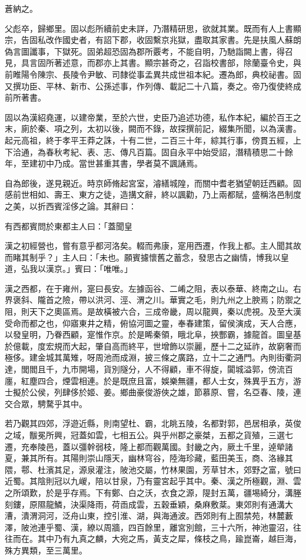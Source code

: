 \begin{pinyinscope}
蒼納之。

父彪卒，歸鄉里。固以彪所續前史未詳，乃潛精研思，欲就其業。既而有人上書顯宗，告固私改作國史者，有詔下郡，收固繫京兆獄，盡取其家書。先是扶風人蘇朗偽言圖讖事，下獄死。固弟超恐固為郡所覈考，不能自明，乃馳詣闕上書，得召見，具言固所著述意，而郡亦上其書。顯宗甚奇之，召詣校書部，除蘭臺令史，與前睢陽令陳宗、長陵令尹敏、司隸從事孟異共成世祖本紀。遷為郎，典校祕書。固又撰功臣、平林、新市、公孫述事，作列傳、載記二十八篇，奏之。帝乃復使終成前所著書。

固以為漢紹堯運，以建帝業，至於六世，史臣乃追述功德，私作本紀，編於百王之末，廁於秦、項之列，太初以後，闕而不錄，故探撰前記，綴集所聞，以為漢書。起元高祖，終于孝平王莽之誅，十有二世，二百三十年，綜其行事，傍貫五經，上下洽通，為春秋考紀、表、志、傳凡百篇。固自永平中始受詔，潛精積思二十餘年，至建初中乃成。當世甚重其書，學者莫不諷誦焉。

自為郎後，遂見親近。時京師脩起宮室，濬繕城隍，而關中耆老猶望朝廷西顧。固感前世相如、壽王、東方之徒，造搆文辭，終以諷勸，乃上兩都賦，盛稱洛邑制度之美，以折西賓淫侈之論。其辭曰：

有西都賓問於東都主人曰：「蓋聞皇

漢之初經營也，嘗有意乎都河洛矣。輟而弗康，寔用西遷，作我上都。主人聞其故而睹其制乎？」主人曰：「未也。願賓攄懷舊之蓄念，發思古之幽情，博我以皇道，弘我以漢京。」賓曰：「唯唯。」

漢之西都，在于雍州，寔曰長安。左據函谷、二崤之阻，表以泰華、終南之山。右界褒斜、隴首之險，帶以洪河、涇、渭之川。華實之毛，則九州之上腴焉；防禦之阻，則天下之奧區焉。是故橫被六合，三成帝畿，周以龍興，秦以虎視。及至大漢受命而都之也，仰寤東井之精，俯協河圖之靈，奉春建策，留侯演成，天人合應，以發皇明，乃眷西顧，寔惟作京。於是睎秦領，睋北阜，挾酆霸，據龍首。圖皇基於億載，度宏規而大起，肇自高而終平，世增飾以崇麗，歷十二之延祚，故窮奢而極侈。建金城其萬雉，呀周池而成淵，披三條之廣路，立十二之通門。內則街衢洞達，閭閻且千，九市開場，貨別隧分，人不得顧，車不得旋，闐城溢郭，傍流百廛，紅塵四合，煙雲相連。於是既庶且富，娛樂無疆，都人士女，殊異乎五方，游士擬於公侯，列肆侈於姬、姜。鄉曲豪俊游俠之雄，節慕原、嘗，名亞春、陵，連交合眾，騁騖乎其中。

若乃觀其四郊，浮遊近縣，則南望杜、霸，北眺五陵，名都對郭，邑居相承，英俊之域，黻冕所興，冠蓋如雲，七相五公。與乎州郡之豪桀，五都之貨殖，三選七遷，充奉陵邑，蓋以彊幹弱枝，隆上都而觀萬國。封畿之內，厥土千里，逴犖諸夏，兼其所有。其陽則崇山隱天，幽林穹谷，陸海珍藏，藍田美玉，商、洛緣其隈，鄠、杜濱其足，源泉灌注，陂池交屬，竹林果園，芳草甘木，郊野之富，號曰近蜀。其陰則冠以九嵕，陪以甘泉，乃有靈宮起乎其中。秦、漢之所極觀，淵、雲之所頌歎，於是乎存焉。下有鄭、白之沃，衣食之源，隄封五萬，疆埸綺分，溝塍刻鏤，原隰龍鱗，決渠降雨，荷臿成雲，五穀垂穎，桑麻敷棻。東郊則有通溝大漕，潰渭洞河，泛舟山東，控引淮、湖，與海通波。西郊則有上囿禁苑，林麓藪澤，陂池連乎蜀、漢，繚以周牆，四百餘里，離宮別館，三十六所，神池靈沼，往往而在。其中乃有九真之麟，大宛之馬，黃支之犀，條枝之鳥，踰崑崙，越巨海，殊方異類，至三萬里。


\end{pinyinscope}

